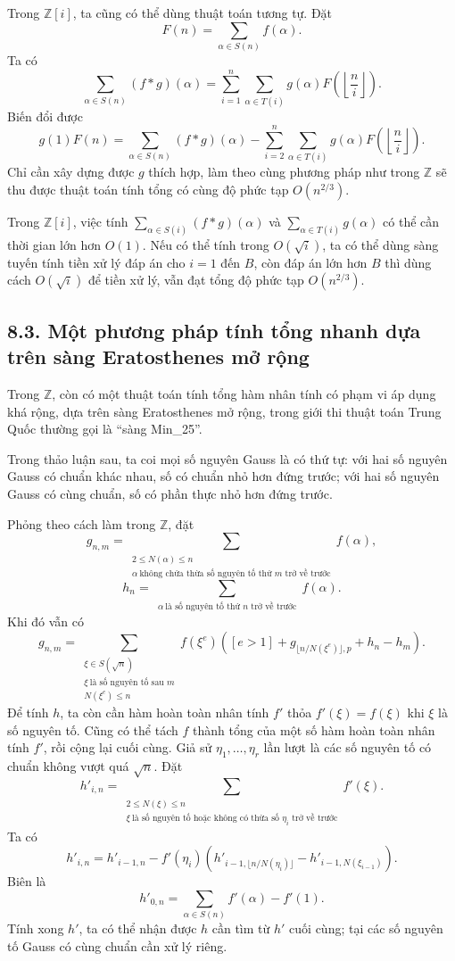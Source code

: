\documentclass[11pt]{article}
\begin{document}
Trong \(\mathbb Z[i]\), ta cũng có thể dùng thuật toán tương tự. Đặt
\[
  F(n)=\sum_{\alpha\in S(n)} f(\alpha).
\]
Ta có
\[
  \sum_{\alpha\in S(n)}(f*g)(\alpha)
  =\sum_{i=1}^n\sum_{\alpha\in T(i)}
    g(\alpha)F\!\left(\left\lfloor\frac ni\right\rfloor\right).
\]
Biến đổi được
\[
  g(1)F(n)=\sum_{\alpha\in S(n)}(f*g)(\alpha)
  -\sum_{i=2}^n\sum_{\alpha\in T(i)}
    g(\alpha)F\!\left(\left\lfloor\frac ni\right\rfloor\right).
\]
Chỉ cần xây dựng được \(g\) thích hợp, làm theo cùng phương pháp như trong
\(\mathbb Z\) sẽ thu được thuật toán tính tổng có cùng độ phức tạp
\(O(n^{2/3})\).

Trong \(\mathbb Z[i]\), việc tính
\(\sum_{\alpha\in S(i)}(f*g)(\alpha)\) và
\(\sum_{\alpha\in T(i)}g(\alpha)\) có thể cần thời gian lớn hơn \(O(1)\). Nếu
có thể tính trong \(O(\sqrt i)\), ta có thể dùng sàng tuyến tính tiền xử lý
đáp án cho \(i=1\) đến \(B\), còn đáp án lớn hơn \(B\) thì dùng cách
\(O(\sqrt i)\) để tiền xử lý, vẫn đạt tổng độ phức tạp \(O(n^{2/3})\).

\subsection*{8.3. Một phương pháp tính tổng nhanh dựa trên sàng Eratosthenes
mở rộng}

Trong \(\mathbb Z\), còn có một thuật toán tính tổng hàm nhân tính có phạm vi
áp dụng khá rộng, dựa trên sàng Eratosthenes mở rộng, trong giới thi thuật
toán Trung Quốc thường gọi là ``sàng Min\_25''.

Trong thảo luận sau, ta coi mọi số nguyên Gauss là có thứ tự: với hai số
nguyên Gauss có chuẩn khác nhau, số có chuẩn nhỏ hơn đứng trước; với hai số
nguyên Gauss có cùng chuẩn, số có phần thực nhỏ hơn đứng trước.

Phỏng theo cách làm trong \(\mathbb Z\), đặt
\[
  g_{n,m}=\sum_{\substack{2\le N(\alpha)\le n\\
      \alpha\ \text{không chứa thừa số nguyên tố thứ }m\text{ trở về trước}}}
    f(\alpha),
\]
\[
  h_n=\sum_{\substack{\alpha\ \text{là số nguyên tố thứ }n\text{ trở về trước}}}
    f(\alpha).
\]
Khi đó vẫn có
\[
  g_{n,m}=
  \sum_{\substack{\xi\in S(\sqrt n)\\
      \xi\ \text{là số nguyên tố sau }m\\
      N(\xi^e)\le n}}
  f(\xi^e)\left([e>1]+g_{\lfloor n/N(\xi^e)\rfloor,p}+h_n-h_m\right).
\]
Để tính \(h\), ta còn cần hàm hoàn toàn nhân tính \(f'\) thỏa
\(f'(\xi)=f(\xi)\) khi \(\xi\) là số nguyên tố. Cũng có thể tách \(f\) thành
tổng của một số hàm hoàn toàn nhân tính \(f'\), rồi cộng lại cuối cùng. Giả
sử \(\eta_1,\ldots,\eta_r\) lần lượt là các số nguyên tố có chuẩn không vượt
quá \(\sqrt n\). Đặt
\[
  h'_{i,n}=
  \sum_{\substack{2\le N(\xi)\le n\\
      \xi\ \text{là số nguyên tố hoặc không có thừa số }\eta_i
      \text{ trở về trước}}}
    f'(\xi).
\]
Ta có
\[
  h'_{i,n}=h'_{i-1,n}
    -f'(\eta_i)\left(h'_{i-1,\lfloor n/N(\eta_i)\rfloor}
      -h'_{i-1,N(\xi_{i-1})}\right).
\]
Biên là
\[
  h'_{0,n}=\sum_{\alpha\in S(n)}f'(\alpha)-f'(1).
\]
Tính xong \(h'\), ta có thể nhận được \(h\) cần tìm từ \(h'\) cuối cùng; tại
các số nguyên tố Gauss có cùng chuẩn cần xử lý riêng.
\end{document}
